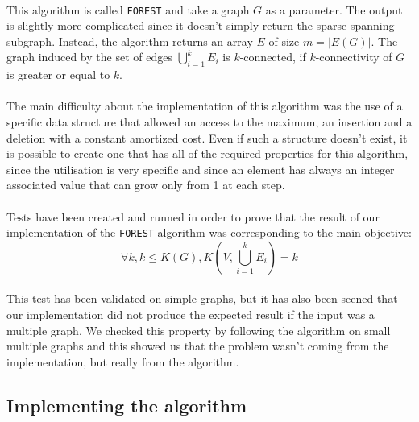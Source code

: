 \paragraph{}
This algorithm is called \verb!FOREST! and take a graph $G$ as a parameter. The
output is slightly more complicated since it doesn't simply return the
sparse spanning subgraph. Instead, the algorithm returns an array $E$ of size
$m = |E(G)|$. The graph induced by the set of edges $\bigcup \limits_{i=1}^k E_i$
is $k$-connected, if $k$-connectivity of $G$ is greater or equal to $k$.

\paragraph{}
The main difficulty about the implementation of this algorithm was the use of a
specific data structure that allowed an access to the maximum, an insertion and
a deletion with a constant amortized cost. Even if such a structure doesn't
exist, it is possible to create one that has all of the required properties for
this algorithm, since the utilisation is very specific and since an element has
always an integer associated value that can grow only from 1 at each step.


\paragraph{}
Tests have been created and runned in order to prove that the result of our
implementation of the \verb!FOREST! algorithm was corresponding to the main
objective:
$$\forall k, k \leq K(G),K(V,\bigcup \limits_{i=1}^k E_i) = k$$

\paragraph{}
This test has been validated on simple graphs, but it has also been seened that
our implementation did not produce the expected result if the input was a
multiple graph. We checked this property by following the algorithm on small
multiple graphs and this showed us that the problem wasn't coming from the
implementation, but really from the algorithm.

\subsection{Implementing the algorithm}
